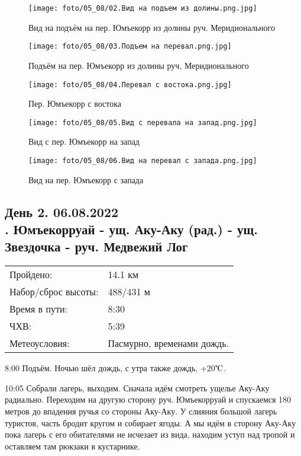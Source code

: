 \begin{figure}
    \centering
    \texttt{[image: foto/05\_08/02.Вид на подъем из долины.png.jpg]}
    \caption{Вид на подъём на пер. Юмъекорр из долины руч. Меридионального}
\end{figure}

\begin{figure}
    \centering
    \texttt{[image: foto/05\_08/03.Подъем на перевал.png.jpg]}
    \caption{Подъём на пер. Юмъекорр из долины руч, Меридионального}
\end{figure}

\begin{figure}
    \centering
    \texttt{[image: foto/05\_08/04.Перевал с востока.png.jpg]}
    \caption{Пер. Юмъекорр с востока}
\end{figure}

\begin{figure}
    \centering
    \texttt{[image: foto/05\_08/05.Вид с перевала на запад.png.jpg]}
    \caption{Вид с пер. Юмъекорр на запад}
\end{figure}

\begin{figure}
    \centering
    \texttt{[image: foto/05\_08/06.Вид на перевал с запада.png.jpg]}
    \caption{Вид на пер. Юмъекорр с запада}
\end{figure}

\subsection{День 2. 06.08.2022\\
. Юмъекорруай - ущ. Аку-Аку (рад.) - ущ. Звездочка - руч. Медвежий Лог}
\begin{tabular}{l p{12cm}}
\hline
Пройдено: & 14.1 км\\
Набор/сброс высоты: & 488/431 м\\
Время в пути: & 8:30\\
ЧХВ: & 5:39\\
Метеоусловия: & Пасмурно, временами дождь.\\
\hline
\end{tabular}

8:00 Подъём.
Ночью шёл дождь, с утра также дождь, +20$\tccentigrade$.

10:05 Собрали лагерь, выходим. Сначала идём смотреть ущелье Аку-Аку радиально.
Переходим на другую сторону руч. Юмъекорруай и спускаемся 180 метров до впадения ручья со стороны Аку-Аку.
У слияния большой лагерь туристов, часть бродит кругом и собирает ягоды. А мы идём в сторону Аку-Аку пока лагерь
с его обитателями не исчезает из вида, находим уступ над тропой и оставляем там рюкзаки в кустарнике.

